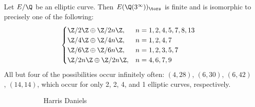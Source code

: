 \begin{frame}[plain]
\begin{thm}
Let $E/\Q$ be an elliptic curve. Then $E(\Q(3^\infty))_\tors$ is finite and is isomorphic to precisely one of the following:
	\[
	\begin{cases}
	\Z/2\Z \oplus \Z/2n\Z, & n= 1,2,4,5,7,8,13 \\
	\Z/4\Z \oplus \Z/4n\Z, & n= 1,2,4,7 \\
	\Z/6\Z \oplus \Z/6n\Z, &  n= 1,2,3,5,7 \\
	\Z/2n\Z \oplus \Z/2n\Z, & n= 4,6,7,9
	\end{cases}
	\]
All but four of the possibilities occur infinitely often: $(4,28)$, $(6,30)$, $(6,42)$, $(14,14)$, which occur for only 2, 2, 4, and 1 elliptic curves, respectively. 
\end{thm}
	\begin{figure}[h]
	\centering
	\begin{subfigure}{0.15\textwidth}
	\captionsetup{labelformat=empty}
	\centering
	\caption{\tiny{Harris Daniels}}
	\end{subfigure}
	\begin{subfigure}{0.25\textwidth}
	\captionsetup{labelformat=empty}

\end{subfigure}
\end{figure}
\end{frame}
